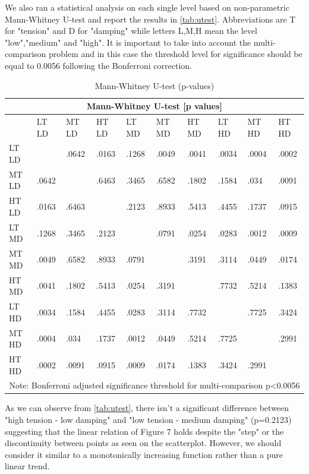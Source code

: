 \documentclass{vgtc}
\begin{document}
We also ran a statistical analysis on each single level based on non-parametric Mann-Whitney U-test and report the results in \autoref{tab:utest}. Abbreviations are T for "tension" and D for "damping" while letters L,M,H mean the level "low","medium" and "high". It is important to take into account the multi-comparison problem and in this case the threshold level for significance should be equal to 0.0056 following the Bonferroni correction.

\def \columnW {0.4cm}
\begin{table}[h!]
\small
\caption{Mann-Whitney U-test (p-values)}
\begin{tabular}{ |p{\columnW}||p{\columnW}|p{\columnW}|p{\columnW}|p{\columnW}|p{\columnW}|p{\columnW}|p{\columnW}|p{\columnW}|p{\columnW}|  }
 \hline
 \multicolumn{10}{|c|}{Mann-Whitney U-test [p values]} \\
 \hline
  & LT LD & MT LD & HT LD & LT MD & MT MD & HT MD & LT HD & MT HD & HT HD \\
 \hline
LT LD &	 &	.0642 &	.0163 &	.1268 &	.0049 &	.0041 &	.0034 &	.0004 &	.0002\\
\hline
MT LD &	.0642 &	 &	.6463 &	.3465 &	.6582 &	.1802 &	.1584 & 	.034 &	.0091\\
\hline
HT LD &	.0163 &	.6463 &	 &	.2123 &	.8933 &	.5413 &	.4455 &	.1737 &	.0915\\
\hline
LT MD &	.1268 &	.3465 &	.2123 &	 &	.0791 &	.0254 &	.0283 &	.0012 &	.0009\\
\hline
MT MD &	.0049 &	.6582 &	.8933 &	.0791 &	 &	.3191 &	.3114 &	.0449 &	.0174\\
\hline
HT MD &	.0041 &	.1802 &	.5413 &.0254 &	.3191 &	 &	.7732 &	.5214 &	.1383\\
\hline
LT HD &	.0034 &	.1584 &	.4455 &	.0283 &	.3114 &	.7732 &	 &	.7725 &	.3424\\
\hline
MT HD &.0004 &	.034 &	.1737 &	.0012 &	.0449 &	.5214 &	.7725 &	 &	.2991\\
\hline
HT HD &	.0002 &	.0091 &	.0915 &	.0009 &	.0174 &	.1383 &	.3424 &	.2991 &	\\

 \hline
 \multicolumn{10}{|c|}{Note: Bonferroni adjusted significance threshold for multi-comparison p\textless0.0056} \\
 \hline
\end{tabular}
\label{tab:utest}
\end{table}

As we can observe from \autoref{tab:utest}, there isn't a significant difference between "high tension - low damping" and "low tension - medium damping" (p=0.2123) suggesting that the linear relation of Figure 7 holds despite the "step" or the discontinuity between points as seen on the scatterplot. However, we should consider it similar to a monotonically increasing function rather than a pure linear trend. 
\end{document}
